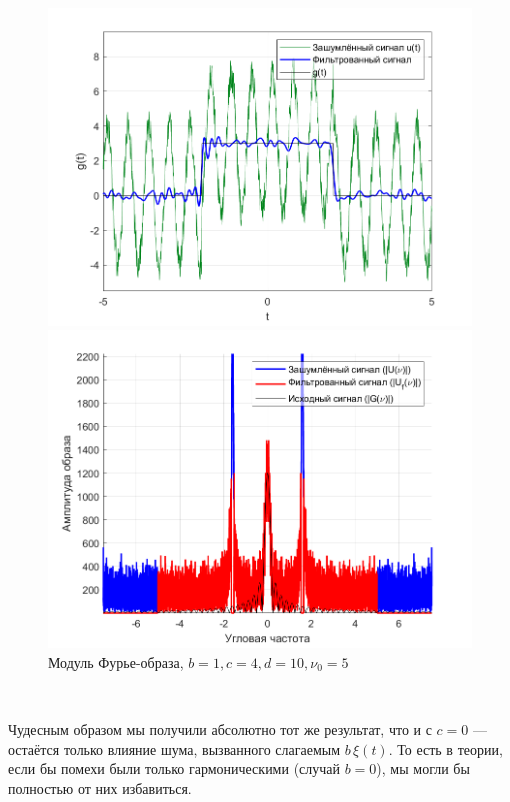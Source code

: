 \documentclass[a4paper]{article}
\begin{document}
\begin{figure}[H]
    \begin{minipage}{0.5\textwidth}
        \centering
        \includegraphics[width=\textwidth]{part2/1_4_10_n.png}
        \caption{$b = 1, c = 4, d = 10, \nu_0 = 5$}
    \end{minipage}    
    \begin{minipage}{0.5\textwidth}
        \centering
        \includegraphics[width=\textwidth]{part2/1_4_10_Fourier_n.png}
        \caption{Модуль Фурье-образа, $b = 1, c = 4, d = 10, \nu_0 = 5$}
    \end{minipage}
\end{figure}\

Чудесным образом мы получили абсолютно тот же результат, что и с $c = 0$ --- остаётся только влияние шума, вызванного слагаемым $b \, \xi(t)$. То есть в теории, если бы помехи были только гармоническими (случай $b = 0$), мы могли бы полностью от них избавиться.
\end{document}
